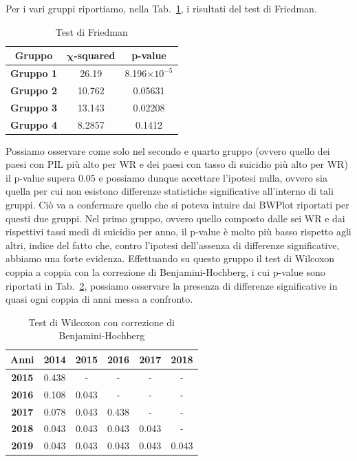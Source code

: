 \documentclass[conference]{IEEEtran}
\begin{document}
Per i vari gruppi riportiamo, nella Tab.~\ref{tab5}, i risultati del test di Friedman.
\begin{table}[htbp]
    \caption{Test di Friedman}
    \begin{center}
    \begin{tabular}{|c|c|c|}
    \hline
    \textbf{Gruppo} & $\boldsymbol{\chi}$\textbf{-squared} & \textbf{p-value} \\
    \hline
    \textbf{Gruppo 1} & 26.19 & 8.196$\times 10^{-5}$ \\\cline{1-3}
    \textbf{Gruppo 2} & 10.762 & 0.05631 \\\cline{1-3}
    \textbf{Gruppo 3} & 13.143 & 0.02208 \\\cline{1-3}
    \textbf{Gruppo 4} & 8.2857 & 0.1412 \\\cline{1-3}
    \hline
    \end{tabular}
    \label{tab5}
    \end{center}
\end{table}
Possiamo osservare come solo nel secondo e quarto gruppo 
(ovvero quello dei paesi con PIL più alto per WR e dei paesi con tasso di
suicidio più alto per WR)
il p-value supera 0.05
e possiamo dunque accettare l'ipotesi nulla, ovvero sia quella per cui non esistono differenze
statistiche significative all'interno di tali gruppi.
Ciò va a confermare quello che si poteva intuire dai BWPlot riportati per questi
due gruppi.
Nel primo gruppo, ovvero quello composto dalle sei WR e dai rispettivi tassi medi di suicidio per
anno, il p-value è molto più basso rispetto agli altri, indice del fatto che,
contro l'ipotesi dell'assenza di differenze significative,
abbiamo una forte evidenza.
Effettuando su questo gruppo il
test di Wilcoxon coppia a coppia con la correzione di Benjamini-Hochberg,
i cui p-value sono riportati in Tab.~\ref{tab6}, possiamo osservare la presenza
di differenze significative in quasi ogni coppia di anni
messa a confronto.
\begin{table}[htbp]
    \caption{Test di Wilcoxon con correzione di Benjamini-Hochberg}
    \begin{center}
    \begin{tabular}{|c|c|c|c|c|c|}
    \hline
    \textbf{Anni} & \textbf{2014} & \textbf{2015} & \textbf{2016} & \textbf{2017} & \textbf{2018} \\
    \hline
    \textbf{2015} & 0.438 & - & - & - & - \\ \hline
    \textbf{2016} & 0.108 & 0.043 & - & - & - \\ \hline
    \textbf{2017} & 0.078 & 0.043 & 0.438 & - & - \\ \hline
    \textbf{2018} & 0.043 & 0.043 & 0.043 & 0.043 & - \\ \hline
    \textbf{2019} & 0.043 & 0.043 & 0.043 & 0.043 & 0.043 \\ 
    \hline
    \end{tabular}
    \label{tab6}
    \end{center}
\end{table}
\end{document}
